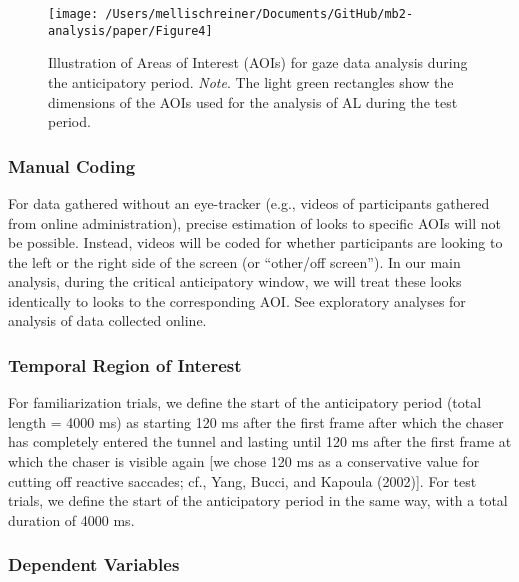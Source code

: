 \documentclass[
  man,floatsintext]{apa6}
\begin{document}
\begin{figure}

{\centering \texttt{[image: /Users/mellischreiner/Documents/GitHub/mb2-analysis/paper/Figure4]} 

}

\caption{Illustration of Areas of Interest (AOIs) for gaze data analysis during the anticipatory period. \newline{} \textit{Note}. The light green rectangles show the dimensions of the AOIs used for the analysis of AL during the test period.}\label{fig:fig3}
\end{figure}

\subsubsection{Manual Coding}\label{manual-coding}

For data gathered without an eye-tracker (e.g., videos of participants gathered from online administration), precise estimation of looks to specific AOIs will not be possible. Instead, videos will be coded for whether participants are looking to the left or the right side of the screen (or ``other/off screen''). In our main analysis, during the critical anticipatory window, we will treat these looks identically to looks to the corresponding AOI. See exploratory analyses for analysis of data collected online.

\subsubsection{Temporal Region of Interest}\label{temporal-region-of-interest}

For familiarization trials, we define the start of the anticipatory period (total length = 4000 ms) as starting 120 ms after the first frame after which the chaser has completely entered the tunnel and lasting until 120 ms after the first frame at which the chaser is visible again {[}we chose 120 ms as a conservative value for cutting off reactive saccades; cf., Yang, Bucci, and Kapoula (2002){]}. For test trials, we define the start of the anticipatory period in the same way, with a total duration of 4000 ms.

\subsubsection{Dependent Variables}\label{dependent-variables}
\end{document}
